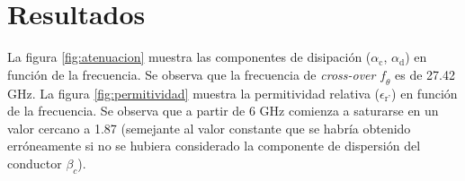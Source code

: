 \documentclass{article}   %
\newcommand*{\freq}{\mathord{\mathit{f}}}
\theoremstyle{mytheoremstyle}
\theoremstyle{mytheoremstyle}
\theoremstyle{myproblemstyle}
\begin{document}
    \begin{minipage}{0.49\textwidth}   %
        \begin{adjustbox}{width=\textwidth}
        \end{adjustbox}
        \label{fig:atenuacion}

        {\centering\section*{\large Resultados}}

        La figura \ref{fig:atenuacion} muestra las componentes de disipación ($\alpha_{\text{c}}$, $\alpha_{\text{d}}$) en función de la
        frecuencia. Se observa que la frecuencia de \textit{cross-over} $\freq_{\theta}$ es de 27.42 GHz. La figura \ref{fig:permitividad} muestra la permitividad relativa ($\epsilon_{\text{r'}}$) en función de la frecuencia.
        Se observa que a partir de 6 GHz comienza a saturarse en un valor cercano a 1.87 (semejante al valor constante que se habría obtenido
        erróneamente si no se hubiera considerado la componente de dispersión del conductor $\beta_c$).


\end{minipage}
\end{document}
